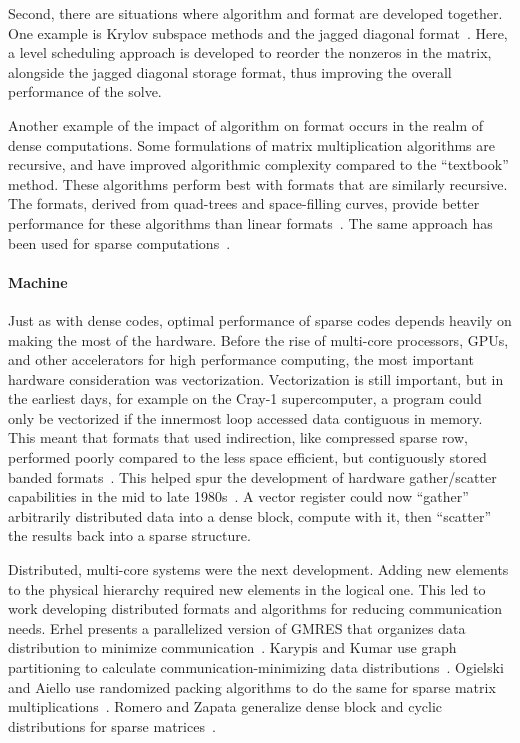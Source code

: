 Second, there are situations where algorithm and format are developed together.
One example is Krylov subspace methods and the jagged diagonal format~\cite{saad1989krylov,montagne2004optimal}.
Here, a level scheduling approach is developed to reorder the nonzeros in the matrix, alongside the jagged diagonal storage format, thus improving the overall performance of the solve.


Another example of the impact of algorithm on format occurs in the realm of dense computations.
Some formulations of matrix multiplication algorithms are recursive, and have improved algorithmic complexity compared to the ``textbook'' method.
These algorithms perform best with formats that are similarly recursive.
The formats, derived from quad-trees and space-filling curves, provide better performance for these algorithms than linear formats~\cite{chatterjee1999recursive,chatterjee1999nonlinear}.
The same approach has been used for sparse computations~\cite{alappat2020recursive,martone2010utilizing,yzelman2012cache,haase2007hilbert}.


\paragraph{Machine}

Just as with dense codes, optimal performance of sparse codes depends heavily on making the most of the hardware.
Before the rise of multi-core processors, GPUs, and other accelerators for high performance computing, the most important hardware consideration was vectorization.
Vectorization is still important, but in the earliest days, for example on the Cray-1 supercomputer, a program could only be vectorized if the innermost loop accessed data contiguous in memory.
This meant that formats that used indirection, like compressed sparse row, performed poorly compared to the less space efficient, but contiguously stored banded formats~\cite{duff1982experience}.
This helped spur the development of hardware gather/scatter capabilities in the mid to late 1980s~\cite{cleveland1987progress}.
A vector register could now \enquote{gather} arbitrarily distributed data into a dense block, compute with it, then \enquote{scatter} the results back into a sparse structure. 

Distributed, multi-core systems were the next development.
Adding new elements to the physical hierarchy required new elements in the logical one.
This led to work developing distributed formats and algorithms for reducing communication needs.
Erhel presents a parallelized version of GMRES that organizes data distribution to minimize communication~\cite{erhel1995parallel}.
Karypis and Kumar use graph partitioning to calculate communication-minimizing data distributions~\cite{karypis1998parallel}.
Ogielski and Aiello use randomized packing algorithms to do the same for sparse matrix multiplications~\cite{ogielski1993sparse}.
Romero and Zapata generalize dense block and cyclic distributions for sparse matrices~\cite{romero1995data}.

